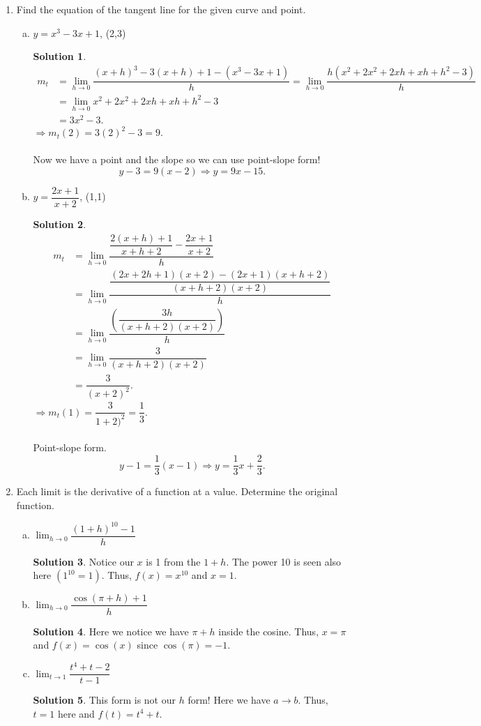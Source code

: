 \documentclass[10pt]{article}
\newcommand{\ds}{\displaystyle}
\theoremstyle{Theorem}
\theoremstyle{definition}
\newtheorem*{solution}{Solution}
\theoremstyle{remark}
\theoremstyle{custom}
\begin{document}
\begin{enumerate}[1.]
\item Find the equation of the tangent line for the given curve and point.
\begin{enumerate}[a.]
\item $y=x^3-3x+1$, (2,3)
\begin{solution}
\begin{align*}
m_t&=\ds\lim_{h\rightarrow 0}\dfrac{(x+h)^3-3(x+h)+1-(x^3-3x+1)}{h}=\ds\lim_{h\rightarrow 0}\dfrac{h(x^2+2x^2+2xh+xh+h^2-3)}{h}\\[2pt]
&=\ds\lim_{h\rightarrow 0} x^2+2x^2+2xh+xh+h^2-3\\[2pt]
&=3x^2-3.
\end{align*}
$\Rightarrow m_t(2)=3(2)^2-3=9.$\\\\
Now we have a point and the slope so we can use point-slope form!
\[
y-3=9(x-2) \Rightarrow y=9x-15.
\]
\end{solution}
\item $y=\dfrac{2x+1}{x+2}$, (1,1)
\begin{solution}
\begin{align*}
m_t&=\lim_{h\rightarrow 0}\dfrac{\dfrac{2(x+h)+1}{x+h+2}-\dfrac{2x+1}{x+2}}{h}\\[2pt]
&=\lim_{h\rightarrow 0} \dfrac{\dfrac{(2x+2h+1)(x+2)-(2x+1)(x+h+2)}{(x+h+2)(x+2)}}{h}\\[2pt]
&=\lim_{h\rightarrow 0}\dfrac{\left(\dfrac{3h}{(x+h+2)(x+2)}\right)}{h}\\[2pt]
&= \lim_{h\rightarrow 0} \dfrac{3}{(x+h+2)(x+2)}\\[2pt]
&=\dfrac{3}{(x+2)^2}.
\end{align*}
$\Rightarrow m_t(1)=\dfrac{3}{1+2)^2}=\dfrac{1}{3}.$\\\\
Point-slope form.
\[
y-1=\dfrac{1}{3}(x-1) \Rightarrow y=\dfrac{1}{3}x+\dfrac{2}{3}.
\]
\end{solution}
\end{enumerate}
\newpage
\item Each limit is the derivative of a function at a value. Determine the original function.
\begin{enumerate}[a.] 
\item $\ds\lim_{h\rightarrow 0}\dfrac{(1+h)^{10}-1}{h}$
\begin{solution}
Notice our $x$ is 1 from the $1+h$. The power 10 is seen also here $(1^{10}=1)$. Thus, $f(x)=x^{10}$ and $x=1$.
\end{solution}
\item $\ds\lim_{h\rightarrow 0}\dfrac{\cos(\pi+h)+1}{h}$
\begin{solution}
Here we notice we have $\pi+h$ inside the cosine. Thus, $x=\pi$ and $f(x)=\cos(x)$ since $\cos(\pi)=-1$.
\end{solution}
\item $\ds\lim_{t\rightarrow 1}\dfrac{t^4+t-2}{t-1}$
\begin{solution}
This form is not our $h$ form! Here we have $a\rightarrow b$. Thus, $t=1$ here and $f(t)=t^4+t$.
\end{solution}


\end{enumerate}
\end{enumerate}
\end{document}
